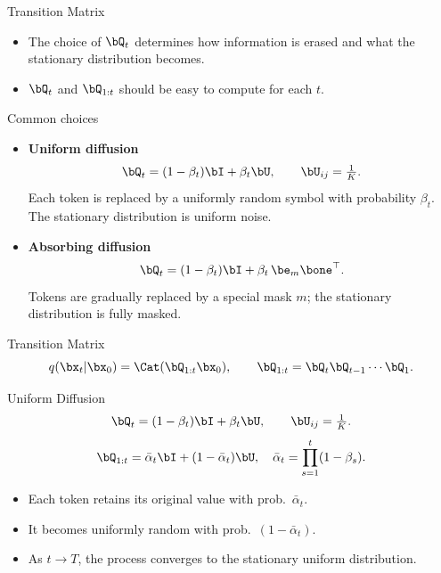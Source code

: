 \documentclass{beamer}
\begin{document}
\begin{frame}{Transition Matrix}
	\begin{itemize}
		\item The choice of $\bQ_t$ determines how information is erased and what the stationary distribution becomes.
		\eqpause
		\item $\bQ_t$ and $\bQ_{1:t}$ should be easy to compute for each $t$.
	\end{itemize}
	\eqpause
	\begin{block}{Common choices}
		\begin{itemize}
			\item \textbf{Uniform diffusion}
			\[
				\bQ_t = (1 - \beta_t) \bI + \beta_t \bU,
				\qquad
				\bU_{ij} = \tfrac{1}{K}.
			\]
			Each token is replaced by a uniformly random symbol with probability $\beta_t$.
			The stationary distribution is uniform noise.
			\eqpause
			\item \textbf{Absorbing diffusion}
			\[
				\bQ_t = (1-\beta_t)\bI + \beta_t\, \be_m \bone^\top.
			\]
			Tokens are gradually replaced by a special mask $m$;
			the stationary distribution is fully masked.
		\end{itemize}
	\end{block}
\end{frame}
\begin{frame}{Transition Matrix}
	\[
		q(\bx_t|\bx_0) = \Cat(\bQ_{1:t}\bx_0),
		\qquad
		\bQ_{1:t} = \bQ_t \bQ_{t-1} \cdots \bQ_1.
	\]
	\eqpause
	\begin{block}{Uniform Diffusion}
		\[
			\bQ_t = (1-\beta_t)\bI + \beta_t \bU,
			\qquad
			\bU_{ij} = \tfrac{1}{K}.
		\]
		\[
			\bQ_{1:t} = \bar\alpha_t\bI + (1 - \bar\alpha_t) \bU,
			\quad
			\bar\alpha_t = \prod_{s=1}^t (1-\beta_s).
		\]
		\eqpause
		\begin{itemize}
			\item Each token retains its original value with prob.~$\bar\alpha_t$.
			\item It becomes uniformly random with prob.~$(1 - \bar\alpha_t)$.
			\item As $t \to T$, the process converges to the stationary uniform distribution.
		\end{itemize}
	\end{block}
\end{frame}
\end{document}
